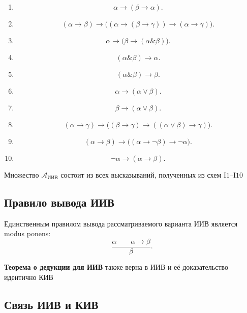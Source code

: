 \documentclass[12pt,a4paper,oneside,openany]{book}
\theoremstyle{definition}
\theoremstyle{plain}
\theoremstyle{remark}
\begin{document}
\begin{enumerate}[label=\textup{I\arabic*.}]
    \item
    \[
    \alpha\to(\beta\to\alpha).
    \]

    \item
    \[
    (\alpha\to\beta)
    \to
    \bigl(
        (\alpha\to(\beta\to\gamma))
        \to
        (\alpha\to\gamma)
    \bigr).
    \]

    \item
    \[
    \alpha\to\bigl(\beta\to
    (\alpha\mathbin{\&}\beta)\bigr).
    \]

    \item
    \[
    (\alpha\mathbin{\&}\beta)\to\alpha.
    \]

    \item
    \[
    (\alpha\mathbin{\&}\beta)\to\beta.
    \]

    \item
    \[
    \alpha\to(\alpha\lor\beta).
    \]

    \item
    \[
    \beta\to(\alpha\lor\beta).
    \]

    \item
    \[
    (\alpha\to\gamma)
    \to
    \bigl(
        (\beta\to\gamma)
        \to
        ((\alpha\lor\beta)\to\gamma)
    \bigr).
    \]

    \item
    \[
    (\alpha\to\beta)
    \to
    \bigl(
        (\alpha\to\neg\beta)
        \to
        \neg\alpha
    \bigr).
    \]

    \item
    \[
    \neg\alpha\to(\alpha\to\beta).
    \]
\end{enumerate}


Множество \(\mathcal A_{\mathrm{ИИВ}}\) состоит из всех высказываний,
полученных из схем \(\mathrm{I1}\)--\(\mathrm{I10}\) 

\subsection{Правило вывода ИИВ}

Единственным правилом вывода рассматриваемого варианта ИИВ является
modus ponens:
\[
\frac{\alpha\qquad\alpha\to\beta}{\beta}.
\]


\textbf{Теорема о дедукции для ИИВ} также верна в ИИВ и её доказательство идентично КИВ

\subsection{Связь ИИВ и КИВ}
\end{document}
